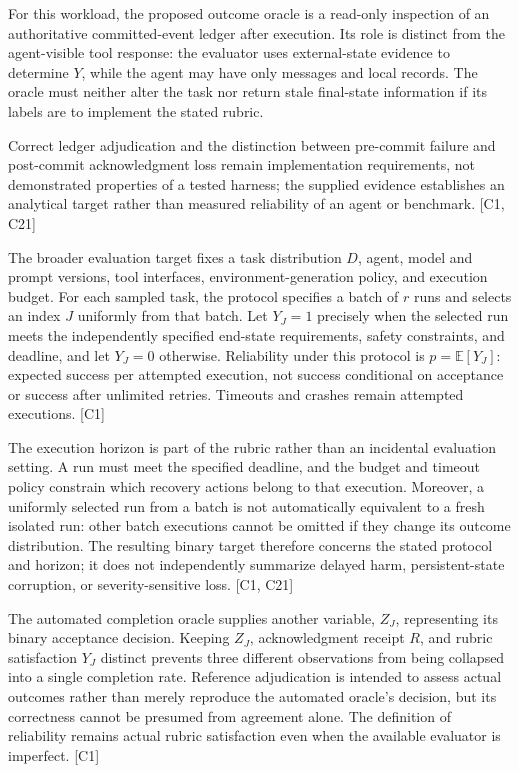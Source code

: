 \documentclass[11pt]{article}
\begin{document}
For this workload, the proposed outcome oracle is a read-only inspection of an authoritative committed-event ledger after execution. Its role is distinct from the agent-visible tool response: the evaluator uses external-state evidence to determine $Y$, while the agent may have only messages and local records. The oracle must neither alter the task nor return stale final-state information if its labels are to implement the stated rubric.

Correct ledger adjudication and the distinction between pre-commit failure and post-commit acknowledgment loss remain implementation requirements, not demonstrated properties of a tested harness; the supplied evidence establishes an analytical target rather than measured reliability of an agent or benchmark. [C1, C21]

The broader evaluation target fixes a task distribution $D$, agent, model and prompt versions, tool interfaces, environment-generation policy, and execution budget. For each sampled task, the protocol specifies a batch of $r$ runs and selects an index $J$ uniformly from that batch. Let $Y_J=1$ precisely when the selected run meets the independently specified end-state requirements, safety constraints, and deadline, and let $Y_J=0$ otherwise. Reliability under this protocol is $p=\mathbb{E}[Y_J]$: expected success per attempted execution, not success conditional on acceptance or success after unlimited retries. Timeouts and crashes remain attempted executions. [C1]

The execution horizon is part of the rubric rather than an incidental evaluation setting. A run must meet the specified deadline, and the budget and timeout policy constrain which recovery actions belong to that execution. Moreover, a uniformly selected run from a batch is not automatically equivalent to a fresh isolated run: other batch executions cannot be omitted if they change its outcome distribution. The resulting binary target therefore concerns the stated protocol and horizon; it does not independently summarize delayed harm, persistent-state corruption, or severity-sensitive loss. [C1, C21]

The automated completion oracle supplies another variable, $Z_J$, representing its binary acceptance decision. Keeping $Z_J$, acknowledgment receipt $R$, and rubric satisfaction $Y_J$ distinct prevents three different observations from being collapsed into a single completion rate. Reference adjudication is intended to assess actual outcomes rather than merely reproduce the automated oracle's decision, but its correctness cannot be presumed from agreement alone. The definition of reliability remains actual rubric satisfaction even when the available evaluator is imperfect. [C1]
\end{document}
